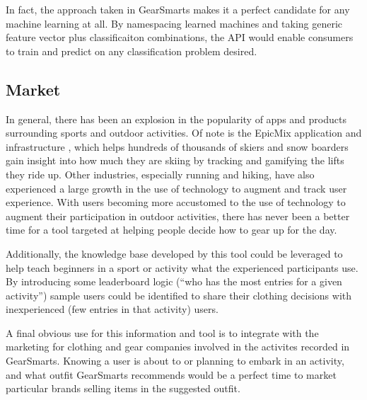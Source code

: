 In fact, the approach taken in GearSmarts makes it a perfect candidate for any machine learning at all. By namespacing
learned machines and taking generic feature vector plus classificaiton combinations, the API would enable consumers to
train and predict on any classification problem desired.

\subsection{Market}
\label{section:market}
In general, there has been an explosion in the popularity of apps and products surrounding sports and outdoor activities.
Of note is the EpicMix application and infrastructure \cite{EpicMix:Site}, which helps hundreds of thousands of skiers and snow
boarders \cite{EpicMix:PlayStore} gain insight into how much they are skiing by tracking and gamifying the lifts they ride up.
Other industries, especially running and hiking, have also experienced a large growth in the use of technology to augment and
track user experience. With users becoming more accustomed to the use of technology to augment their participation in outdoor
activities, there has never been a better time for a tool targeted at helping people decide how to gear up for the day.

Additionally, the knowledge base developed by this tool could be leveraged to help teach beginners in a sport or activity
what the experienced participants use. By introducing some leaderboard logic (``who has the most entries for a given activity'')
sample users could be identified to share their clothing decisions with inexperienced (few entries in that activity) users.

A final obvious use for this information and tool is to integrate with the marketing for clothing and gear companies
involved in the activites recorded in GearSmarts. Knowing a user is about to or planning to embark in an activity, and
what outfit GearSmarts recommends would be a perfect time to market particular brands selling items in the suggested outfit.